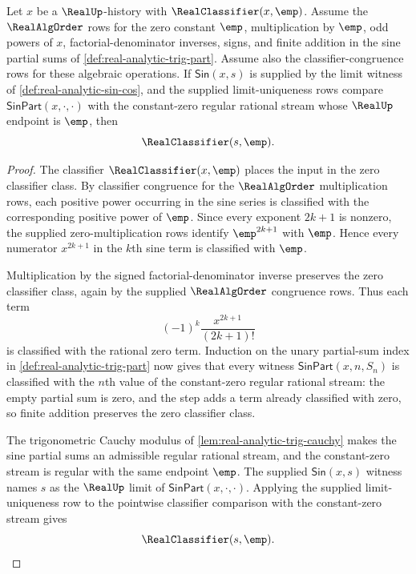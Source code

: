 \begin{theorem}
\label{thm:real-analytic-sin-empty-input-zero}
Let $x$ be a $\RealUp$-history with $\RealClassifier(x,\emp)$. Assume the $\RealAlgOrder$ rows for the zero constant $\emp$, multiplication by $\emp$, odd powers of $x$, factorial-denominator inverses, signs, and finite addition in the sine partial sums of \autoref{def:real-analytic-trig-part}. Assume also the classifier-congruence rows for these algebraic operations. If $\mathsf{Sin}(x,s)$ is supplied by the limit witness of \autoref{def:real-analytic-sin-cos}, and the supplied limit-uniqueness rows compare $\mathsf{SinPart}(x,\cdot,\cdot)$ with the constant-zero regular rational stream whose $\RealUp$ endpoint is $\emp$, then
$$
\RealClassifier(s,\emp).
$$
\end{theorem}
\begin{proof}
The classifier $\RealClassifier(x,\emp)$ places the input in the zero classifier class. By classifier congruence for the $\RealAlgOrder$ multiplication rows, each positive power occurring in the sine series is classified with the corresponding positive power of $\emp$. Since every exponent $2k+1$ is nonzero, the supplied zero-multiplication rows identify $\emp^{2k+1}$ with $\emp$. Hence every numerator $x^{2k+1}$ in the $k$th sine term is classified with $\emp$.

Multiplication by the signed factorial-denominator inverse preserves the zero classifier class, again by the supplied $\RealAlgOrder$ congruence rows. Thus each term
$$
(-1)^k\frac{x^{2k+1}}{(2k+1)!}
$$
is classified with the rational zero term. Induction on the unary partial-sum index in \autoref{def:real-analytic-trig-part} now gives that every witness $\mathsf{SinPart}(x,n,S_n)$ is classified with the $n$th value of the constant-zero regular rational stream: the empty partial sum is zero, and the step adds a term already classified with zero, so finite addition preserves the zero classifier class.

The trigonometric Cauchy modulus of \autoref{lem:real-analytic-trig-cauchy} makes the sine partial sums an admissible regular rational stream, and the constant-zero stream is regular with the same endpoint $\emp$. The supplied $\mathsf{Sin}(x,s)$ witness names $s$ as the $\RealUp$ limit of $\mathsf{SinPart}(x,\cdot,\cdot)$. Applying the supplied limit-uniqueness row to the pointwise classifier comparison with the constant-zero stream gives
$$
\RealClassifier(s,\emp).
$$
\end{proof}
